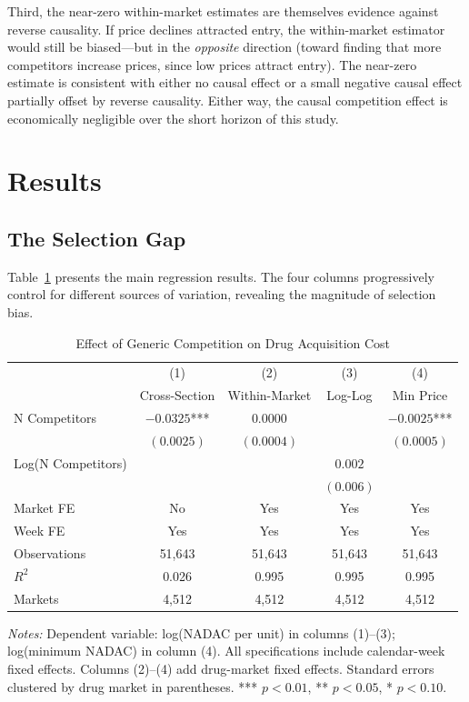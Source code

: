 \documentclass[12pt]{article}
\begin{document}
Third, the near-zero within-market estimates are themselves evidence against reverse causality. If price declines attracted entry, the within-market estimator would still be biased---but in the \emph{opposite} direction (toward finding that more competitors increase prices, since low prices attract entry). The near-zero estimate is consistent with either no causal effect or a small negative causal effect partially offset by reverse causality. Either way, the causal competition effect is economically negligible over the short horizon of this study.


\section{Results}\label{sec:results}

\subsection{The Selection Gap}

Table~\ref{tab:main_results} presents the main regression results. The four columns progressively control for different sources of variation, revealing the magnitude of selection bias.

\begin{table}[H]
\centering
\caption{Effect of Generic Competition on Drug Acquisition Cost}\label{tab:main_results}
\begin{threeparttable}
\begin{tabular}{lcccc}
\toprule
& (1) & (2) & (3) & (4) \\
& Cross-Section & Within-Market & Log-Log & Min Price \\
\midrule
N Competitors & $-0.0325$*** & $0.0000$ & & $-0.0025$*** \\
& $(0.0025)$ & $(0.0004)$ & & $(0.0005)$ \\
Log(N Competitors) & & & $0.002$ & \\
& & & $(0.006)$ & \\
\addlinespace[0.5em]
Market FE & No & Yes & Yes & Yes \\
Week FE & Yes & Yes & Yes & Yes \\
\addlinespace[0.3em]
Observations & 51,643 & 51,643 & 51,643 & 51,643 \\
$R^2$ & 0.026 & 0.995 & 0.995 & 0.995 \\
Markets & 4,512 & 4,512 & 4,512 & 4,512 \\
\bottomrule
\end{tabular}
\begin{tablenotes}[flushleft]
\small
\item \textit{Notes:} Dependent variable: log(NADAC per unit) in columns (1)--(3); log(minimum NADAC) in column (4). All specifications include calendar-week fixed effects. Columns (2)--(4) add drug-market fixed effects. Standard errors clustered by drug market in parentheses. *** $p < 0.01$, ** $p < 0.05$, * $p < 0.10$.
\end{tablenotes}
\end{threeparttable}
\end{table}
\end{document}
